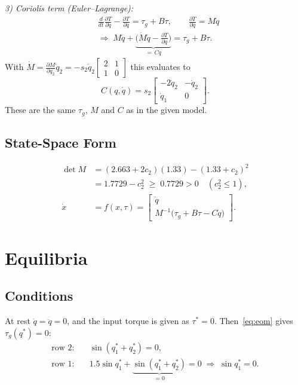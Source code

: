 \documentclass[10pt,twocolumn,letterpaper]{article}
\begin{document}
\textit{3) Coriolis term (Euler--Lagrange):}
\begin{align*}
&\frac{d}{dt}\frac{\partial T}{\partial\dot q}-\frac{\partial T}{\partial q}=\tau_g+B\tau,\qquad \frac{\partial T}{\partial\dot q}=M\dot q\\
&\Rightarrow\; M\ddot q+\underbrace{\Big(\dot M\dot q-\frac{\partial T}{\partial q}\Big)}_{=\,C\dot q}=\tau_g+B\tau .
\end{align*}
With $\dot M=\frac{\partial M}{\partial q_2}\dot q_2=-s_2\dot q_2\left[\begin{smallmatrix}2&1\\1&0\end{smallmatrix}\right]$ this evaluates to
\begin{equation}
C(q,\dot q)=s_2\begin{bmatrix}-2\dot q_2 & -\dot q_2\\ \dot q_1 & 0\end{bmatrix}.\label{eq:C}
\end{equation}
These are the same $\tau_g$, $M$ and $C$ as in the given model.

\subsection{State-Space Form}
\begin{align}
\det M&=(2.663+2c_2)(1.33)-(1.33+c_2)^2\nonumber\\
&=1.7729-c_2^2\;\ge\;0.7729>0\quad(c_2^2\le1),\nonumber\\
\dot x&=f(x,\tau)=\begin{bmatrix}\dot q\\ M^{-1}\big(\tau_g+B\tau-C\dot q\big)\end{bmatrix}.\label{eq:f}
\end{align}

\section{Equilibria}
\subsection{Conditions}
At rest $\dot q=\ddot q=0$, and the input torque is given as $\tau^*=0$. Then~\eqref{eq:eom} gives $\tau_g(q^*)=0$:
\begin{align*}
\text{row 2:}\quad&\sin(q_1^*+q_2^*)=0,\\
\text{row 1:}\quad&1.5\sin q_1^*+\underbrace{\sin(q_1^*+q_2^*)}_{=0}=0\;\Rightarrow\;\sin q_1^*=0 .
\end{align*}
\end{document}
